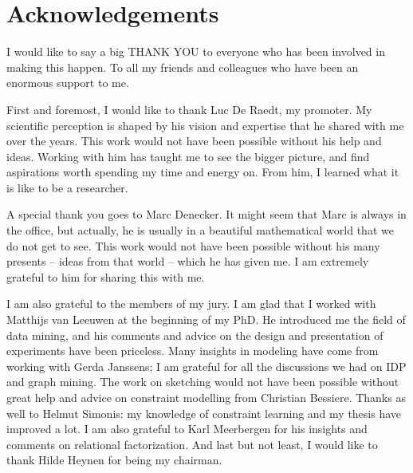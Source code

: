 \chapter{Acknowledgements} \label{ch:ack} I would like to say a big THANK YOU to everyone who has been involved in making this happen. To all my friends and colleagues who have been an enormous support to me.  

First and foremost, I would like to thank Luc De Raedt, my promoter. My scientific perception is shaped by his vision and expertise that he shared with me over the years. This work would not have been possible without his help and ideas. Working with him has taught me to see the bigger picture, and find aspirations worth spending my time and energy on. From him, I learned what it is like to be a researcher.

A special thank you goes to Marc Denecker. It might seem that Marc is always in the office, but actually, he is usually in a beautiful mathematical world that we do not get to see. This work would not have been possible without his many presents -- ideas from that world -- which he has given me. I am extremely grateful to him for sharing this with me.

I am also grateful to the members of my jury. I am glad that I worked with Matthijs van Leeuwen at the beginning of my PhD. He introduced me the field of data mining, and his comments and advice on the design and presentation of experiments have been priceless. Many insights in modeling have come from working with Gerda Janssens; I am grateful for all the discussions we had on IDP and graph mining. The work on sketching would not have been possible without great help and advice on constraint modelling from Christian Bessiere. Thanks as well to Helmut Simonis: my knowledge of constraint learning and my thesis have improved a lot. I am also grateful to Karl Meerbergen for his insights and comments on relational factorization. And last but not least, I would like to thank Hilde Heynen for being my chairman.


